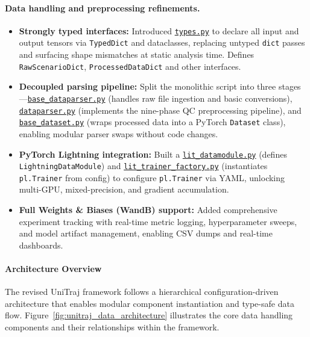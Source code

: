 \paragraph{Data handling and preprocessing refinements.}
\begin{itemize}[leftmargin=*]
  \item \textbf{Strongly typed interfaces:} Introduced \href{https://github.com/JanDuchscherer104/UniTraj/blob/main/unitraj/datasets/types.py}{\texttt{types.py}} to declare all input and output tensors via \texttt{TypedDict} and dataclasses, replacing untyped \texttt{dict} passes and surfacing shape mismatches at static analysis time. Defines \texttt{RawScenarioDict}, \texttt{ProcessedDataDict} and other interfaces.
  \item \textbf{Decoupled parsing pipeline:} Split the monolithic script into three stages—\href{https://github.com/JanDuchscherer104/UniTraj/blob/main/unitraj/datasets/base_dataparser.py}{\texttt{base\_dataparser.py}} (handles raw file ingestion and basic conversions), \href{https://github.com/JanDuchscherer104/UniTraj/blob/main/unitraj/datasets/dataparser.py}{\texttt{dataparser.py}} (implements the nine-phase QC preprocessing pipeline), and \href{https://github.com/JanDuchscherer104/UniTraj/blob/main/unitraj/datasets/base_dataset.py}{\texttt{base\_dataset.py}} (wraps processed data into a PyTorch \texttt{Dataset} class), enabling modular parser swaps without code changes.
  \item \textbf{PyTorch Lightning integration:} Built a \href{https://github.com/JanDuchscherer104/UniTraj/blob/main/unitraj/lightning/lit_datamodule.py}{\texttt{lit\_datamodule.py}} (defines \texttt{LightningDataModule}) and \href{https://github.com/JanDuchscherer104/UniTraj/blob/main/unitraj/lightning/lit_trainer_factory.py}{\texttt{lit\_trainer\_factory.py}} (instantiates \texttt{pl.Trainer} from config) to configure \texttt{pl.Trainer} via YAML, unlocking multi-GPU, mixed-precision, and gradient accumulation.
  \item \textbf{Full Weights \& Biases (WandB) support:} Added comprehensive experiment tracking with real-time metric logging, hyperparameter sweeps, and model artifact management, enabling CSV dumps and real-time dashboards.
\end{itemize}

\paragraph{Architecture Overview}
The revised UniTraj framework follows a hierarchical configuration-driven architecture that enables modular component instantiation and type-safe data flow. Figure~\ref{fig:unitraj_data_architecture} illustrates the core data handling components and their relationships within the framework.

